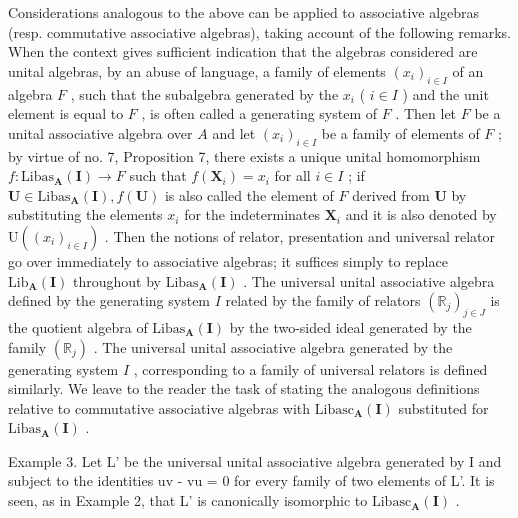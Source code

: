 Considerations analogous to the above can be applied to associative algebras (resp. commutative associative algebras), taking account of the following remarks. When the context gives sufficient indication that the algebras considered are unital algebras, by an abuse of language, a family of elements \((x_{i})_{i\in I}\) of an algebra \(F\) , such that the subalgebra generated by the \(x_{i}\) ( \(i\in I\) ) and the unit element is equal to \(F\) , is often called a generating system of \(F\) . Then let \(F\) be a unital associative algebra over \(A\) and let \((x_{i})_{i\in I}\) be a family of elements of \(F\) ; by virtue of no. 7, Proposition 7, there exists a unique unital homomorphism \(f:\mathrm{Libas}_{\mathbf{A}}(\mathbf{I})\to F\) such that \(f(\mathbf{X}_i) = x_i\) for all \(i\in I\) ; if \(\mathbf{U}\in \mathrm{Libas}_{\mathbf{A}}(\mathbf{I}), f(\mathbf{U})\) is also called the element of \(F\) derived from \(\mathbf{U}\) by substituting the elements \(x_{i}\) for the indeterminates \(\mathbf{X}_i\) and it is also denoted by \(\mathrm{U}((x_{i})_{i\in I})\) . Then the notions of relator, presentation and universal relator go over immediately to associative algebras; it suffices simply to replace \(\mathrm{Lib}_{\mathbf{A}}(\mathbf{I})\) throughout by \(\mathrm{Libas}_{\mathbf{A}}(\mathbf{I})\) . The universal unital associative algebra defined by the generating system \(I\) related by the family of relators \((\mathbb{R}_j)_{j\in J}\) is the quotient algebra of \(\mathrm{Libas}_{\mathbf{A}}(\mathbf{I})\) by the two-sided ideal generated by the family \((\mathbb{R}_j)\) . The universal unital associative algebra generated by the generating system \(I\) , corresponding to a family of universal relators is defined similarly. We leave to the reader the task of stating the analogous definitions relative to commutative associative algebras with \(\mathrm{Libasc}_{\mathbf{A}}(\mathbf{I})\) substituted for \(\mathrm{Libas}_{\mathbf{A}}(\mathbf{I})\) .

Example 3. Let L' be the universal unital associative algebra generated by I and subject to the identities uv - vu = 0 for every family of two elements of L'. It is seen, as in Example 2, that L' is canonically isomorphic to \(\text{Libasc}_{\mathbf{A}}(\mathbf{I})\) .

